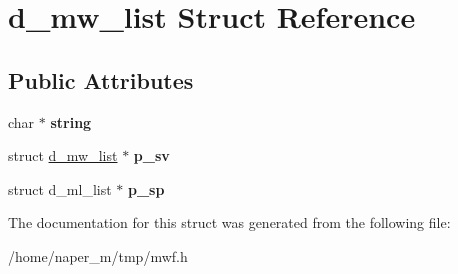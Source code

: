 \hypertarget{structd__mw__list}{\section{d\-\_\-mw\-\_\-list Struct Reference}
\label{structd__mw__list}
}
\subsection*{Public Attributes}
\begin{DoxyCompactItemize}
\item 
\hypertarget{structd__mw__list_a328d3e74d0fe913a4ae5489a13398919}{char $\ast$ {\bfseries string}}\label{structd__mw__list_a328d3e74d0fe913a4ae5489a13398919}

\item 
\hypertarget{structd__mw__list_a74a1a931e529dd6d631829596e895503}{struct \hyperlink{structd__mw__list}{d\-\_\-mw\-\_\-list} $\ast$ {\bfseries p\-\_\-sv}}\label{structd__mw__list_a74a1a931e529dd6d631829596e895503}

\item 
\hypertarget{structd__mw__list_a427d3b9f9f64620a10caed7b96ef8147}{struct d\-\_\-ml\-\_\-list $\ast$ {\bfseries p\-\_\-sp}}\label{structd__mw__list_a427d3b9f9f64620a10caed7b96ef8147}

\end{DoxyCompactItemize}


The documentation for this struct was generated from the following file\-:\begin{DoxyCompactItemize}
\item 
/home/naper\-\_\-m/tmp/mwf.\-h\end{DoxyCompactItemize}
